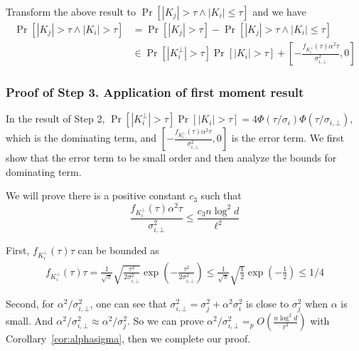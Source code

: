 Transform the above result to $\Pr\left[|K_j |>\tau \wedge | K_i | \leq \tau \right]$ and we have
\begin{equation} \label{eqn:temp9}
\begin{split}
    \Pr\left[|K_j |>\tau \wedge | K_i | > \tau \right]
    &= \Pr\left[|K_j |>\tau \right] - \Pr\left[|K_j |>\tau \wedge | K_i | \leq \tau \right]  \\ 
    &\in \Pr[|K^{\bot}_i| > \tau ]\Pr[|K_i| > \tau ] + \left[-\frac{f_{K^{\bot}_i}(\tau )\alpha^2 \tau}{\sigma^2_{i,\bot}}, 0 \right]    
\end{split}
\end{equation}


\subsubsection{Proof of Step 3. Application of first moment result }
In the result of Step 2, $\Pr[|K^{\bot}_i| > \tau ]\Pr[|K_i| > \tau ] = 4\Phi(\tau/\sigma_i)\Phi(\tau/\sigma_{i,\bot})$, which is the dominating term, and $\left[-\frac{f_{K^{\bot}_i}(\tau )\alpha^2 \tau}{\sigma^2_{i,\bot}} ,0\right]$ is the error term. We first show that the error term to be small order and then analyze the bounds for dominating term.

We will prove there is a positive constant $c_3$ such that 
\label{eqn: probbound}
\begin{equation}
    \frac{f_{K^{\bot}_i}(\tau )\alpha^2 \tau}{\sigma^2_{i,\bot}}
    \leq \frac{c_3n \log^2d}{ \ell^{2}}
\end{equation}

First, $f_{K^{\bot}_i}(\tau ) \tau$ can be bounded as
\begin{equation}
\begin{split}
    f_{K^{\bot}_i}(\tau ) \tau
    = \frac{1}{\sqrt{\pi}}\sqrt{\frac{\tau^2}{2\sigma^2_{i,\bot}}} \exp \left(-\frac{\tau^2}{2 \sigma^2_{i,\bot}}  \right)  
    \leq \frac{1}{\sqrt{\pi}}\sqrt{\frac{1}{2}} \exp \left(-\frac{1}{2} \right) 
    \leq 1/4
\end{split}  
\end{equation}

Second, for $\alpha^2/\sigma^2_{i,\bot}$, one can see that $\sigma^2_{i,\bot} = \sigma^2_j + \alpha^2 \sigma^2_i$ is close to $\sigma^2_j$ when $\alpha$ is small. And $\alpha^2/\sigma^2_{i,\bot} \approx \alpha^2/\sigma^2_{j}$. So we can prove $\alpha^2/\sigma^2_{i,\bot} =_p O\left(\frac{n \log^2 d}{\ell^{3}}\right)$ with Corollary~\ref{cor:alphasigma}, then we complete our proof.

